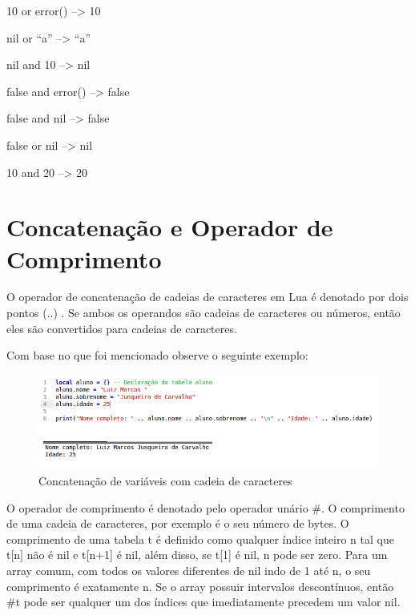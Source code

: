 \documentclass[
12pt, %
openright, %
oneside, %
a4paper, %
english, %
brazil, %
]{abntex2}
\begin{document}
10 or error()       --> 10

nil or ``a''        --> ``a''

nil and 10          --> nil

false and error()   --> false

false and nil       --> false

false or nil        --> nil

10 and 20           --> 20

\section{Concatenação e Operador de Comprimento}
O operador de concatenação de cadeias de caracteres em Lua é denotado por dois pontos (..) . Se ambos os operandos são cadeias de caracteres ou números, então eles são convertidos para cadeias de caracteres.

Com base no que foi mencionado observe o seguinte exemplo:

\begin{figure}[H]
\centering
\includegraphics[width=1\linewidth]{imagens/concatenacao.png}
\caption{Concatenação de variáveis com cadeia de caracteres}
\end{figure}

O operador de comprimento é denotado pelo operador unário \#. O comprimento de uma cadeia de caracteres, por exemplo é o seu número de bytes. O comprimento de uma tabela t é definido como qualquer índice inteiro n tal que t[n] não é nil e t[n+1] é nil, além disso, se t[1] é nil, n pode ser zero. Para um array comum, com todos os valores diferentes de nil indo de 1 até n, o seu comprimento é exatamente n. Se o array possuir intervalos descontínuos, então \#t pode ser qualquer um dos índices que imediatamente precedem um valor nil.
\end{document}
